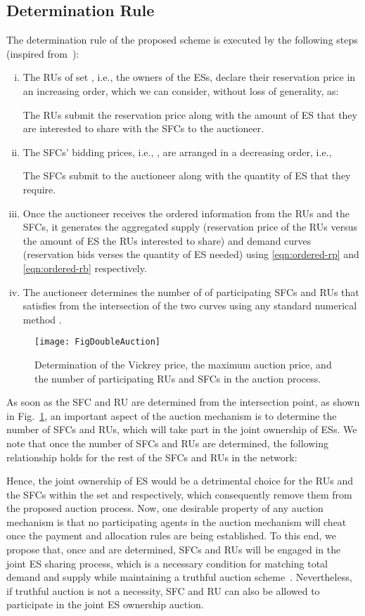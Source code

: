 \documentclass[journal,10pt]{IEEEtran}
\begin{document}
\subsection{Determination Rule} The determination rule of the proposed scheme is executed by the following steps (inspired from~\cite{Huang-doubleauction:2002}):
\begin{enumerate}[i)]
\item The RUs of set , i.e., the owners of the ESs, declare their reservation price  in an increasing order, which we can consider, without loss of generality, as:

The RUs submit the reservation price along with the amount  of ES that they are interested to share with the SFCs to the auctioneer.
\item The SFCs' bidding prices, i.e., , are arranged in a decreasing order, i.e.,

The SFCs submit to the auctioneer along with the quantity  of ES that they require.
\item Once the auctioneer receives the ordered information from the RUs and the SFCs, it generates the aggregated supply (reservation price of the RUs versus the amount of ES the RUs interested to share) and demand curves (reservation bids  verses the quantity of ES  needed) using \eqref{eqn:ordered-rp} and \eqref{eqn:ordered-rb} respectively.
\item The auctioneer determines the number of of participating SFCs  and RUs  that satisfies  from the intersection of the two curves using any standard numerical method \cite{Huang-doubleauction:2002}.
\end{enumerate}
\begin{figure}[t!]
\centering
\texttt{[image: FigDoubleAuction]}
\caption{Determination of the Vickrey price, the maximum auction price, and the number of participating RUs and SFCs in the auction process.} \label{fig:doubleauction}
\end{figure}

As soon as the SFC  and RU  are determined from the intersection point, as shown in Fig.~\ref{fig:doubleauction}, an important aspect of the auction mechanism is to determine the number of SFCs and RUs, which will take part in the joint ownership of ESs. We note that once the number of SFCs  and RUs  are determined, the following relationship holds for the rest of the SFCs and RUs in the network:

Hence, the joint ownership of ES would be a detrimental choice for the RUs and the SFCs within the set  and  respectively, which consequently remove them from the proposed auction process. Now, one desirable property of any auction mechanism is that no participating agents in the auction mechanism will cheat once the payment and allocation rules are being established. To this end, we propose that, once  and  are determined,   SFCs and  RUs will be engaged in the joint ES sharing process, which is a necessary condition for matching total demand and supply while maintaining a truthful auction scheme~\cite{Huang-doubleauction:2002}. Nevertheless, if truthful auction is not a necessity, SFC  and RU  can also be allowed to participate in the joint ES ownership auction.
\end{document}
